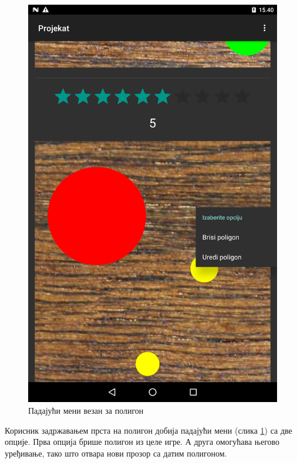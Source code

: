 \begin{figure}[htb!]
\begin{center}
\includegraphics[scale=.1]{pictures/main/PolygonMenu}
\caption{Падајући мени везан за полигон}\label{fig:mainPolygonMenu}
\end{center}
\end{figure}
Корисник задржавањем прста на полигон добија падајући мени (слика \ref{fig:mainPolygonMenu}) са две опције. Прва опција брише полигон из целе игре. А друга омогућава његово уређивање, тако што отвара нови прозор са датим полигоном.

